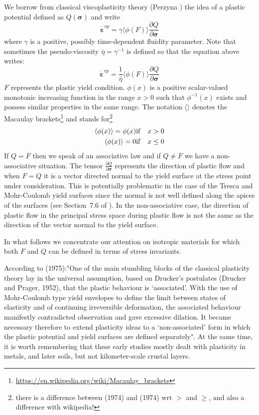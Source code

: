We borrow from classical viscoplasticity theory (Perzyna \cite{perz66,perz88}) the idea of 
a plastic potential defined as $Q({\bm \sigma})$ and write
\begin{equation}
{\dot{\bm \varepsilon}}^{vp} 
= \gamma \Big\langle
\phi\left( F \right) 
\Big\rangle
\frac{\partial Q}{\partial \bm\sigma}
\end{equation}
where $\gamma$ is a positive, possibly time-dependent fluidity parameter. 
Note that sometimes the pseudo-viscosity $\bar{\eta}=\gamma^{-1}$ is defined \cite{zigo74}
so that the equation above writes:
\begin{equation}
{\dot{\bm \varepsilon}}^{vp} 
= \frac{1}{\bar{\eta}} \Big\langle
\phi\left( F \right) 
\Big\rangle
\frac{\partial Q}{\partial \bm\sigma}
\end{equation}
$F$ represents the plastic yield condition.
$\phi(x)$ is a positive scalar-valued monotonic increasing function in the range 
$x>0$ such that $\phi^{-1}(x)$ exists and possess similar properties in the same range. 
The notation $\langle \rangle$ denotes the Macaulay 
brackets\footnote{\url{https://en.wikipedia.org/wiki/Macaulay_brackets}} and stands 
for\footnote{there is a difference between 
\textcite{zico74}(1974) and \textcite{zico74b}(1974) wrt $>$ and $\ge$, and also 
a difference with wikipedia!} 
\begin{eqnarray}
\langle \phi(x) \rangle = \phi(x) & {\rm if} & x>0 \nonumber\\
\langle \phi(x) \rangle = 0 & {\rm if} & x\le 0 \nonumber
\end{eqnarray}
If $Q=F$ then we speak of an associative law and if $Q \neq F$ we have a non-associative situation. 
The tensor $\frac{\partial Q}{\partial \bm\sigma}$ represents the direction
of plastic flow and when $F=Q$ it is a vector directed normal to the yield surface
at the stress point under consideration. This is potentially problematic in the 
case of the Tresca and Mohr-Coulomb yield surfaces since the normal is not well defined
along the apices of the surfaces (see Section~7.6 of \textcite{owhi}).
In the non-associative case, the direction of plastic flow in the 
principal  stress space during plastic flow is not the same
as the direction of the vector normal to the yield surface.

In what follows we concentrate our attention on isotropic materials for which 
both $F$ and $Q$ can be defined in terms of stress invariants.

According to \textcite{zihl75} (1975):"One of the main stumbling blocks of the 
classical plasticity theory lay in the universal
assumption, based on Drucker's postulates (Drucker and Prager, 1952), that the plastic 
behaviour is `associated'. With the use of Mohr-Coulomb type yield envelopes to define the
limit between states of elasticity and of continuing irreversible deformation,
the associated behaviour manifestly contradicted observation and gave excessive dilation.
It became necessary therefore to extend plasticity ideas to a `non-associated'
form in which the plastic potential and yield surfaces are defined separately".
At the same time, it is worth remembering that these early studies mostly dealt
with plasticity in metals, and later soils, but not kilometer-scale crustal layers.

